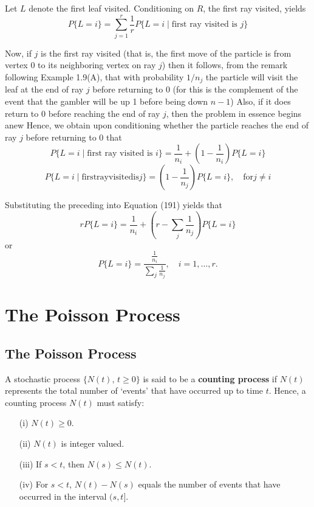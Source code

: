 \documentclass[lang=cn,10pt]{elegantbook}
\begin{document}
\begin{solution}
	Let $L$ denote the first leaf visited. Conditioning on $R$, the first ray visited, yields
\begin{equation}
P\{L = i\} = \sum_{j=1}^{r} \frac{1}{r} P\{L = i \mid \text{first ray visited is } j\}
\end{equation}

Now, if $j$ is the first ray visited (that is, the first move of the particle is from vertex 0 to its neighboring vertex on ray $j$) then it follows, from the remark following Example 1.9(A), that with probability $1/n_j$ the particle will visit the leaf at the end of ray $j$ before returning to 0 (for this is the complement of the event that the gambler will be up 1 before being down $n - 1$) Also, if it does return to 0 before reaching the end of ray $j$, then the problem in essence begins anew Hence, we obtain upon conditioning whether the particle reaches the end of ray $j$ before returning to 0 that
\[
P\{L = i \mid \text{first ray visited is } i\} = \frac{1}{n_i} + (1 - \frac{1}{n_i}) P\{L = i\}
\]
\[
	P\{L=i\mid \mathrm{first} \mathrm{ray} \mathrm{visited} \mathrm{is} j\}=(1-\frac{1}{n_j})P\{L=i\},\quad \mathrm{for} j\ne i
\]

Substituting the preceding into Equation (191) yields that
\[
r P\{L = i\} = \frac{1}{n_i} + \left(r - \sum_j \frac{1}{n_j}\right) P\{L = i\}
\]
or
\[
P\{L = i\} = \frac{\frac{1}{n_i}}{\sum_j \frac{1}{n_j}}, \quad i = 1, \ldots, r.
\]
\end{solution}
\chapter{The Poisson Process}
\section{The Poisson Process}
A stochastic process \(\{N(t), \, t \geq 0\}\) is said to be a \textbf{counting process} if \(N(t)\) represents the total number of `events' that have occurred up to time \(t\). Hence, a counting process \(N(t)\) must satisfy:

\begin{enumerate}
    \item[(i)] \(N(t) \geq 0\).
    \item[(ii)] \(N(t)\) is integer valued.
    \item[(iii)] If \(s < t\), then \(N(s) \leq N(t)\).
    \item[(iv)] For \(s < t\), \(N(t) - N(s)\) equals the number of events that have occurred in the interval \((s, t]\).
\end{enumerate}
\end{document}
